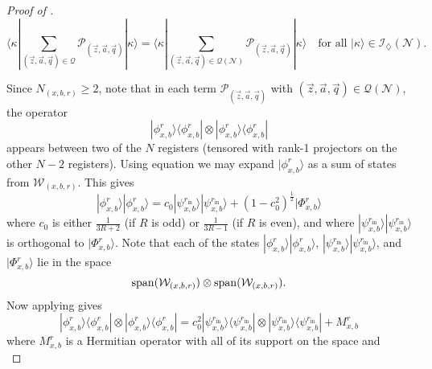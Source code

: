 \documentclass[../thesis-main/thesis-main]{subfiles}
\begin{document}
\begin{proof}[Proof of \protect{}]
\begin{equation}
\langle\kappa|\sum_{(\vec{z},\vec{a},\vec{q})\in\mathcal{Q}}\mathcal{P}_{(\vec{z},\vec{a},\vec{q})}|\kappa\rangle=\langle\kappa|\sum_{(\vec{z},\vec{a},\vec{q})\in\mathcal{Q}(\mathcal{N})}\mathcal{P}_{(\vec{z},\vec{a},\vec{q})}|\kappa\rangle\quad\text{for all }|\kappa\rangle\in\mathcal{I}_{\diamondsuit}(\mathcal{N}).\label{eq:restrict_attention_mathcalN}
\end{equation}

Since $N_{(x,b,r)}\geq2$, note that in each term $\mathcal{P}_{(\vec{z},\vec{a},\vec{q})}$ with $(\vec{z},\vec{a},\vec{q})\in\mathcal{Q}(\mathcal{N})$, the operator 
\begin{equation}
|\phi_{x,b}^{r}\rangle\langle\phi_{x,b}^{r}|\otimes|\phi_{x,b}^{r}\rangle\langle\phi_{x,b}^{r}|
\end{equation}
appears between two of the $N$ registers (tensored with rank-1 projectors on the other $N-2$ registers). Using equation  we may expand $|\phi_{x,b}^{r}\rangle$ as a sum of states from $\mathcal{W}_{(x,b,r)}$. This gives
\begin{equation}
|\phi_{x,b}^{r}\rangle|\phi_{x,b}^{r}\rangle=c_{0}|\psi_{x,b}^{r_{\text{in}}}\rangle|\psi_{x,b}^{r_{\text{in}}}\rangle+\left(1-c_{0}^{2}\right)^{\frac{1}{2}}|\Phi_{x,b}^{r}\rangle
\end{equation}
where $c_{0}$ is either $\frac{1}{3R+2}$ (if $R$ is odd) or $\frac{1}{3R-1}$ (if $R$ is even), and where $|\psi_{x,b}^{r_{\text{in}}}\rangle|\psi_{x,b}^{r_{\text{in}}}\rangle$ is orthogonal to $|\Phi_{x,b}^{r}\rangle$. Note that each of the states $|\phi_{x,b}^{r}\rangle|\phi_{x,b}^{r}\rangle$, $|\psi_{x,b}^{r_{\text{in}}}\rangle|\psi_{x,b}^{r_{\text{in}}}\rangle$, and $|\Phi_{x,b}^{r}\rangle$ lie in the space 
\begin{equation}
\operatorname{span}(\mathcal{W}_{(x,b,r)})\otimes\operatorname{span}(\mathcal{W}_{(x,b,r)}).
\label{eq:tensor_prod_WW}
\end{equation}
Now applying  gives
\begin{equation}
|\phi_{x,b}^{r}\rangle\langle\phi_{x,b}^{r}|\otimes|\phi_{x,b}^{r}\rangle\langle\phi_{x,b}^{r}|=c_{0}^{2}|\psi_{x,b}^{r_{\text{in}}}\rangle\langle\psi_{x,b}^{r_{\text{in}}}|\otimes|\psi_{x,b}^{r_{\text{in}}}\rangle\langle\psi_{x,b}^{r_{\text{in}}}|+M_{x,b}^{r}\label{eq:expand_phi_phi_proj}
\end{equation}
where $M_{x,b}^{r}$ is a Hermitian operator with all of its support on the space  and
\begin{equation}

\end{equation}
\end{proof}
\end{document}
